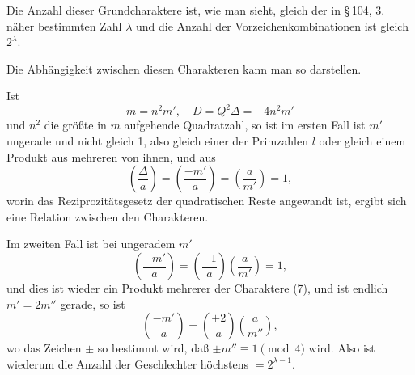 Die Anzahl dieser Grundcharaktere ist, wie man sieht, gleich
der in \S\,104, 3. näher bestimmten Zahl $\lambda$ und die Anzahl der
Vorzeichenkombinationen ist gleich $2^\lambda$.

Die Abhängigkeit zwischen diesen Charakteren kann man so
darstellen.

Ist
\[
m = n^2 m', \quad D = Q^2\Delta = -4n^2m'
\]
und $n^2$ die größte in $m$ aufgehende Quadratzahl, so ist
im ersten Fall ist $m'$ ungerade und nicht gleich 1, also gleich
einer der Primzahlen $l$ oder gleich einem Produkt aus mehreren
von ihnen, und aus
\[
\left(\frac{\Delta}{a}\right) = \left(\frac{-m'}{a}\right) = \left(\frac{a}{m'}\right) = 1,
\]
worin das Reziprozitätsgesetz der quadratischen Reste angewandt
ist, ergibt sich eine Relation zwischen den Charakteren.

Im zweiten Fall ist bei ungeradem $m'$
\[
\left(\frac{-m'}{a}\right) = \left(\frac{-1}{a}\right)\left(\frac{a}{m'}\right) = 1,
\]
und dies ist wieder ein Produkt mehrerer der Charaktere (7),
und ist endlich $m' = 2m''$ gerade, so ist
\[
\left(\frac{-m'}{a}\right) = \left(\frac{\pm 2}{a}\right)\left(\frac{a}{m''}\right),
\]
wo das Zeichen $\pm$ so bestimmt wird, daß $\pm m'' \equiv 1 \pmod 4$ wird.
Also ist wiederum die Anzahl der Geschlechter höchstens $= 2^{\lambda-1}$.
